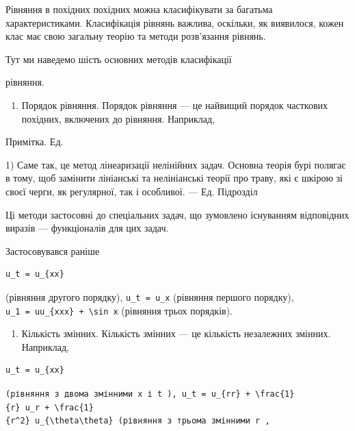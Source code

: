 \documentclass[
  ukrainian,
]{article}
\providecommand{\tightlist}{%
  \setlength{\itemsep}{0pt}\setlength{\parskip}{0pt}}
\begin{document}
Рівняння в похідних похідних можна класифікувати за багатьма
характеристиками. Класифікація рівнянь важлива, оскільки, як виявилося,
кожен клас має свою загальну теорію та методи розв'язання рівнянь.

Тут ми наведемо шість основних методів класифікації

рівняння.

\begin{enumerate}
\def\labelenumi{\arabic{enumi}.}
\tightlist
\item
  Порядок рівняння. Порядок рівняння --- це найвищий порядок часткових
  похідних, включених до рівняння. Наприклад,
\end{enumerate}

Примітка. Ед.

1) Саме так, це метод лінеаризації нелінійних задач. Основна теорія бурі
полягає в тому, щоб замінити лініанські та нелініанські теорії про
траву, які є шкірою зі своєї черги, як регулярної, так і особливої. ---
Ед. Підрозділ

Ці методи застосовні до спеціальних задач, що зумовлено існуванням
відповідних виразів --- функціоналів для цих задач.

Застосовувався раніше

\begin{verbatim}
u_t = u_{xx}
\end{verbatim}

(рівняння другого порядку), \texttt{u\_t\ =\ u\_x} (рівняння першого
порядку), \texttt{u\_1\ =\ uu\_\{xxx\}\ +\ \textbackslash{}sin\ x}
(рівняння трьох порядків).

\begin{enumerate}
\def\labelenumi{\arabic{enumi}.}
\setcounter{enumi}{1}
\tightlist
\item
  Кількість змінних. Кількість змінних --- це кількість незалежних
  змінних. Наприклад,
\end{enumerate}

\begin{verbatim}
u_t = u_{xx}
\end{verbatim}

\texttt{(рівняння\ з\ двома\ змінними\ \textquotesingle{}x\textquotesingle{}\ і\ \textquotesingle{}t\textquotesingle{}\ ),\ \textquotesingle{}u\_t\ =\ u\_\{rr\}\ +\ \textbackslash{}frac\{1\}\{r\}\ u\_r\ +\ \textbackslash{}frac\{1\}\{r\^{}2\}\ u\_\{\textbackslash{}theta\textbackslash{}theta\}\textquotesingle{}\ (рівняння\ з\ трьома\ змінними\ \textquotesingle{}r\textquotesingle{}\ ,}
\end{document}
